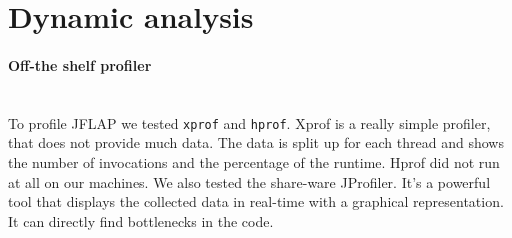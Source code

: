 \documentclass{paper}
\begin{document}
\section{Dynamic analysis}


\paragraph{Off-the shelf profiler}\mbox{}\vspace{10pt}\\
To profile JFLAP we tested \texttt{xprof} and \texttt{hprof}. Xprof is a really simple profiler, that does not provide much data. The data is split up for each thread and shows the number of invocations and the percentage of the runtime. Hprof did not run at all on our machines. We also tested the share-ware JProfiler. It's a powerful tool that displays the collected data in real-time with a graphical representation. It can directly find bottlenecks in the code.
\end{document}
